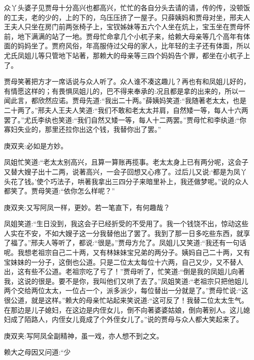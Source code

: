 \begin{parag}
    众丫头婆子见贾母十分高兴也都高兴，忙忙的各自分头去请的请，传的传，没顿饭的工夫，老的少的，上的下的，乌压压挤了一屋子。只薛姨妈和贾母对坐，邢夫人王夫人只坐在房门前两张椅子上，宝钗姊妹等五六个人坐在炕上，宝玉坐在贾母怀前，地下满满的站了一地。贾母忙命拿几个小杌子来，给赖大母亲等几个高年有体面的妈妈坐了。贾府风俗，年高服侍过父母的家人，比年轻的主子还有体面，所以尤氏凤姐儿等只管地下站著，那赖大的母亲等三四个妈妈告个罪，都坐在小杌子上了。
\end{parag}


\begin{parag}
    贾母笑著把方才一席话说与众人听了。众人谁不凑这趣儿？再也有和凤姐儿好的，有情愿这样的；有畏惧凤姐儿的，巴不得来奉承的:况且都是拿的出来的，所以一闻此言，都欣然应诺。贾母先道:“我出二十两。”薛姨妈笑道:“我随著老太太，也是二十两了。”邢夫人王夫人笑道:“我们不敢和老太太并肩，自然矮一等，每人十六两罢了。”尤氏李纨也笑道:“我们自然又矮一等，每人十二两罢。”贾母忙和李纨道:“你寡妇失业的，那里还拉你出这个钱，我替你出了罢。”\begin{note}庚双夹:必如是方妙。\end{note}凤姐忙笑道:“老太太别高兴，且算一算账再揽事。老太太身上已有两分呢，这会子又替大嫂子出十二两，说著高兴，一会子回想又心疼了。过后儿又说:‘都是为凤丫头花了钱。’使个巧法子，哄著我拿出三四分子来暗里补上，我还做梦呢。”说的众人都笑了。贾母笑道:“依你怎么样呢？”\begin{note}庚双夹:又写阿凤一样，更妙。若一笔直下，有何趣哉？\end{note}凤姐笑道:“生日没到，我这会子已经折受的不受用了。我一个钱饶不出，惊动这些人实在不安，不如大嫂子这一分我替他出了罢了。我到了那一日多吃些东西，就享了福了。”邢夫人等听了，都说:“很是。”贾母方允了。凤姐儿又笑道:“我还有一句话呢。我想老祖宗自己二十两，又有林妹妹宝兄弟的两分子。姨妈自己二十两，又有宝妹妹的一分子，这倒也公道。只是二位太太每位十六两，自己又少，又不替人出，这有些不公道。老祖宗吃了亏了！”贾母听了，忙笑道:“倒是我的凤姐儿向著我，这说的很是。要不是你，我叫他们又哄了去了。”凤姐笑道:“老祖宗只把他姐儿两个交给两位太太，一位占一个，派多派少，每位替出一分就是了。”贾母忙说:“这很公道，就是这样。”赖大的母亲忙站起来笑说道:“这可反了！我替二位太太生气。在那边是儿子媳妇，在这边是内侄女儿，倒不向著婆婆姑娘，倒向著别人。这儿媳妇成了陌路人，内侄女儿竟成了个外侄女儿了。”说的贾母与众人都大笑起来了。\begin{note}庚双夹:写阿凤全副精神，虽一戏，亦人想不到之文。\end{note}赖大之母因又问道:“少
\end{parag}
